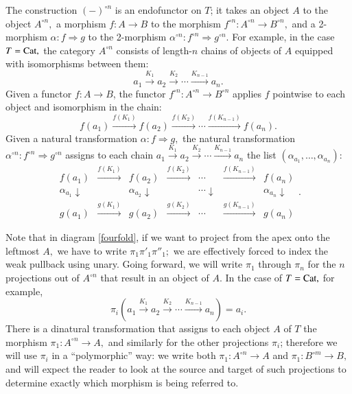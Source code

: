 \documentclass{article}
\newcommand{\Cat}{{\rm Cat}}
\newcommand{\maps}{\colon}
\begin{document}
The construction $(-)^{\circ n}$ is an endofunctor on $T$; it takes an object $A$ to the object $A^{\circ n},$ a morphism $f\maps A\to B$ to the morphism $f^{\circ n}\maps A^{\circ n}\to B^{\circ n},$ and a 2-morphism $\alpha\maps f\Rightarrow g$ to the 2-morphism $\alpha^{\circ n}\maps f^{\circ n} \Rightarrow g^{\circ n}.$  For example, in the case $T=\Cat,$ the category $A^{\circ n}$ consists of length-$n$ chains of objects of $A$ equipped with isomorphisms between them:
\[ a_1 \stackrel{K_1}{\to} a_2 \stackrel{K_2}{\to} \cdots \stackrel{K_{n-1}}{\to} a_n. \]
Given a functor $f\maps A \to B$, the functor $f^{\circ n}\maps A^{\circ n}\to B^{\circ n}$ applies $f$ pointwise to each object and isomorphism in the chain:
\[ f(a_1) \stackrel{f(K_1)}{\to} f(a_2) \stackrel{f(K_2)}{\to} \cdots \stackrel{f(K_{n-1})}{\to} f(a_n). \]
Given a natural transformation $\alpha\maps f\Rightarrow g,$ the natural transformation $\alpha^{\circ n}\maps f^{\circ n}\Rightarrow g^{\circ n}$ assigns to each chain $a_1 \stackrel{K_1}{\to} a_2 \stackrel{K_2}{\to} \cdots \stackrel{K_{n-1}}{\to} a_n$ the list $(\alpha_{a_1},\ldots,\alpha_{a_n})$:
\[
\begin{array}{ccccccc}
  f(a_1) & \stackrel{f(K_1)}{\to} & f(a_2) & \stackrel{f(K_2)}{\to} & \cdots & \stackrel{f(K_{n-1})}{\to} & f(a_n) \\
  \alpha_{a_1}\downarrow & & \alpha_{a_2}\downarrow & & \cdots \downarrow & & \alpha_{a_n}\downarrow \\
  g(a_1) & \stackrel{g(K_1)}{\to} & g(a_2) & \stackrel{g(K_2)}{\to} & \cdots & \stackrel{g(K_{n-1})}{\to} & g(a_n)
\end{array}.
\]

Note that in diagram \ref{fourfold}, if we want to project from the apex onto the leftmost $A,$ we have to write $\pi_1\pi'_1\pi''_1;$ we are effectively forced to index the weak pullback using unary.  Going forward, we will write $\pi_1$ through $\pi_n$ for the $n$ projections out of $A^{\circ n}$ that result in an object of $A$.  In the case of $T=\Cat,$ for example,
\[ \pi_i(a_1 \stackrel{K_1}{\to} a_2 \stackrel{K_2}{\to} \cdots \stackrel{K_{n-1}}{\to} a_n) = a_i. \]
There is a dinatural transformation that assigns to each object $A$ of $T$ the morphism $\pi_1\maps A^{\circ n} \to A,$ and similarly for the other projections $\pi_i$; therefore we will use $\pi_i$ in a ``polymorphic'' way: we write both $\pi_1\maps A^{\circ n} \to A$ and $\pi_1\maps B^{\circ m} \to B,$ and will expect the reader to look at the source and target of such projections to determine exactly which morphism is being referred to.
\end{document}
